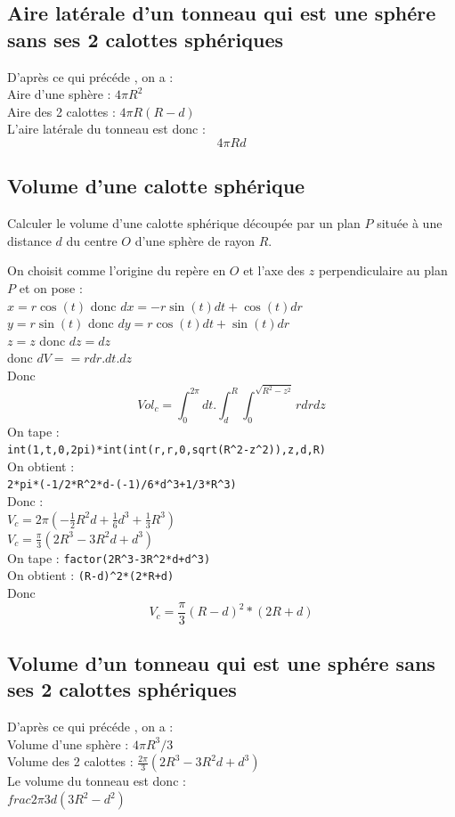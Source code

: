 \documentclass[a4paper,11pt]{book}
\begin{document}
\subsection{Aire lat\'erale d'un tonneau qui est une sph\'ere sans ses 2 calottes sph\'eriques}
D'apr\`es ce qui pr\'ec\'ede , on a :\\
Aire d'une sph\`ere : $4\pi R^2$\\
Aire des 2 calottes : $4\pi R(R-d)$\\
L'aire lat\'erale du tonneau est donc :
$$4\pi Rd$$
\subsection{Volume d'une calotte sph\'erique}
Calculer le volume d'une calotte sph\'erique d\'ecoup\'ee par un plan $P$
situ\'ee \`a une distance $d$ du centre $O$ d'une sph\`ere de rayon $R$.

On choisit comme l'origine du rep\`ere en $O$ et l'axe des $z$ perpendiculaire 
au plan $P$ et on pose :\\
$x=r\cos(t)$ donc $dx=-r\sin(t)dt+\cos(t)dr$\\
$y=r\sin(t)$ donc $dy=r\cos(t)dt+\sin(t)dr$\\
$z=z$ donc $dz=dz$\\
donc $dV==rdr.dt.dz$\\
Donc 
$$Vol_c=\int_0^{2\pi}dt.\int_d^R\int_0^{\sqrt{R^2-z^2}}rdrdz$$
On tape :\\
{\tt int(1,t,0,2pi)*int(int(r,r,0,sqrt(R\verb|^|2-z\verb|^|2)),z,d,R)}\\
On obtient :\\
{\tt 2*pi*(-1/2*R\verb|^|2*d-(-1)/6*d\verb|^|3+1/3*R\verb|^|3)}\\
Donc :\\
$V_c=2\pi(-\frac{1}{2}R^2d+\frac{1}{6}d^3+\frac{1}{3}R^3)$\\
$V_c=\frac{\pi}{3}(2R^3-3R^2d+d^3)$\\
On tape : {\tt factor(2R\verb|^|3-3R\verb|^|2*d+d\verb|^|3)}\\
On obtient : {\tt (R-d)\verb|^|2*(2*R+d)}\\
Donc
$$V_c=\frac{\pi}{3}(R-d)^2*(2R+d) $$
\subsection{Volume d'un tonneau qui est une sph\'ere sans ses 2 calottes sph\'eriques}
D'apr\`es ce qui pr\'ec\'ede , on a :\\
Volume d'une sph\`ere : $4\pi R^3/3$\\
Volume des 2 calottes : $\frac{2\pi}{3}(2R^3-3R^2d+d^3)$\\
Le volume du tonneau est donc :\\
$frac{2\pi}{3}d(3R^2-d^2)$
\end{document}
